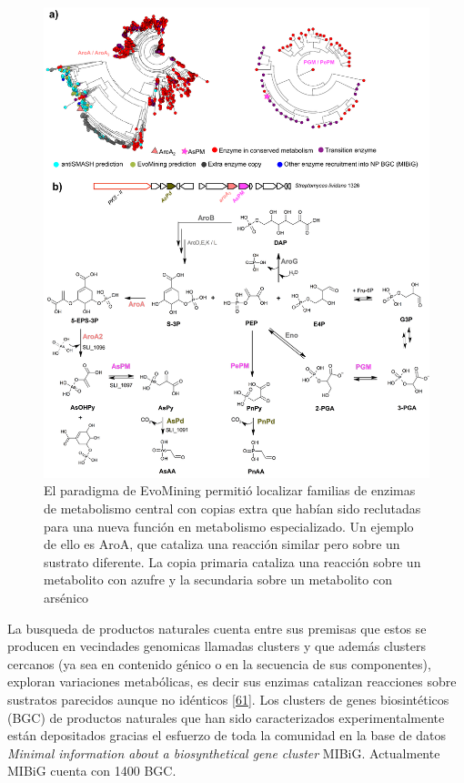 \documentclass[12pt,twoside]{reedthesis}
\begin{document}
  \begin{figure}[h!tbp]
  \centering
  \includegraphics[angle = 0,scale = 0.6]{Arseno.pdf}
  \caption[El paradigma de EvoMining permitió localizar familias de enzimas de metabolismo central con copias extra que habían sido reclutadas para una nueva función en metabolismo especializado. Un ejemplo de ello es AroA, que cataliza una reacción similar pero sobre un sustrato diferente. La copia primaria cataliza una reacción sobre un metabolito con azufre y la secundaria sobre un metabolito con arsénico]{\normalsize{El paradigma de EvoMining permitió localizar familias de enzimas de metabolismo central con copias extra que habían sido reclutadas para una nueva función en metabolismo especializado. Un ejemplo de ello es AroA, que cataliza una reacción similar pero sobre un sustrato diferente. La copia primaria cataliza una reacción sobre un metabolito con azufre y la secundaria sobre un metabolito con arsénico}}
  \label{fig:Arseno}
  \end{figure}
  
  La busqueda de productos naturales cuenta entre sus premisas que estos
  se producen en vecindades genomicas llamadas clusters y que además
  clusters cercanos (ya sea en contenido génico o en la secuencia de sus
  componentes), exploran variaciones metabólicas, es decir sus enzimas
  catalizan reacciones sobre sustratos parecidos aunque no idénticos
  {[}\protect\hyperlink{ref-cruz-morales_phylogenomic_2016}{61}{]}. Los
  clusters de genes biosintéticos (BGC) de productos naturales que han
  sido caracterizados experimentalmente están depositados gracias el
  esfuerzo de toda la comunidad en la base de datos \emph{Minimal
  information about a biosynthetical gene cluster} MIBiG. Actualmente
  MIBiG cuenta con 1400 BGC.
  
\end{document}
